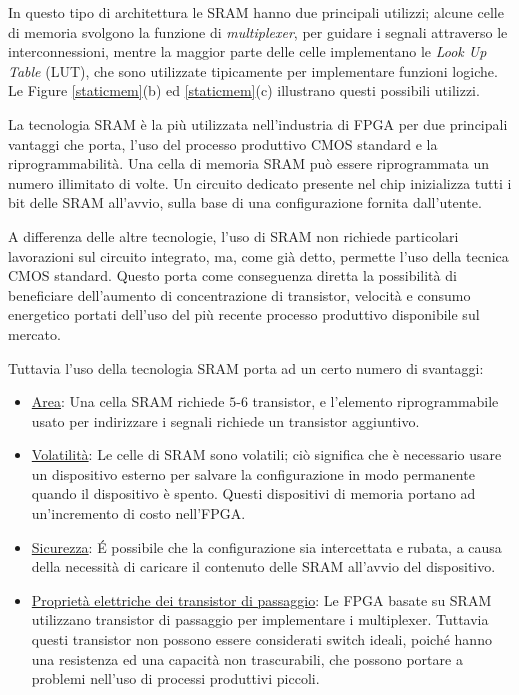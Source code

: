 In questo tipo di architettura le SRAM hanno due principali utilizzi; alcune celle di memoria svolgono la funzione di \textit{multiplexer}, per guidare i segnali attraverso le interconnessioni, mentre la maggior parte delle celle implementano le \textit{Look Up Table} (LUT), che sono utilizzate tipicamente per implementare funzioni logiche. Le Figure \ref{staticmem}(b) ed \ref{staticmem}(c) illustrano questi possibili utilizzi.

La tecnologia SRAM è la più utilizzata nell'industria di FPGA per due principali vantaggi che porta, l'uso del processo produttivo CMOS standard e la riprogrammabilità. Una cella di memoria SRAM può essere riprogrammata un numero illimitato di volte. Un circuito dedicato presente nel chip inizializza tutti i bit delle SRAM all'avvio, sulla base di una configurazione fornita dall'utente.

A differenza delle altre tecnologie, l'uso di SRAM non richiede particolari lavorazioni sul circuito integrato, ma, come già detto, permette l'uso della tecnica CMOS standard. Questo porta come conseguenza diretta la possibilità di beneficiare dell'aumento di concentrazione di transistor, velocità e consumo energetico portati dell'uso del più recente processo produttivo disponibile sul mercato.

Tuttavia l'uso della tecnologia SRAM porta ad un certo numero di svantaggi:
\begin{itemize}
	\item \underline{Area}: Una cella SRAM richiede $5$-$6$ transistor, e l'elemento riprogrammabile usato per indirizzare i segnali richiede un transistor aggiuntivo.
	\item \underline{Volatilità}: Le celle di SRAM sono volatili; ciò significa che è necessario usare un dispositivo esterno per salvare la configurazione in modo permanente quando il dispositivo è spento. Questi dispositivi di memoria portano ad un'incremento di costo nell'FPGA.
	\item \underline{Sicurezza}: \'E possibile che la configurazione sia intercettata e rubata, a causa della necessità di caricare il contenuto delle SRAM all'avvio del dispositivo.
	\item \underline{Proprietà elettriche dei transistor di passaggio}: Le FPGA basate su SRAM utilizzano transistor di passaggio per implementare i multiplexer. Tuttavia questi transistor non possono essere considerati switch ideali, poiché hanno una resistenza ed una capacità non trascurabili, che possono portare a problemi nell'uso di processi produttivi piccoli.
\end{itemize}

